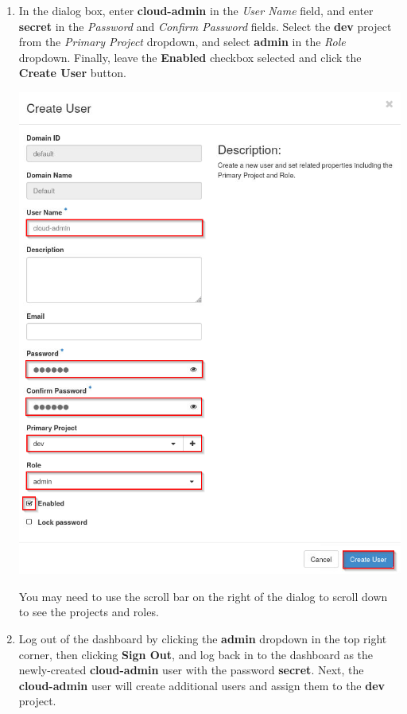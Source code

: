 \documentclass[letterpaper, 12pt]{article}
\begin{document}
\begin{enumerate}
    \item In the dialog box, enter \textbf{cloud-admin} in the \textit{User Name} field, and enter \textbf{secret} in the \textit{Password} and \textit{Confirm Password} fields.
    Select the \textbf{dev} project from the \textit{Primary Project} dropdown, and select \textbf{admin} in the \textit{Role} dropdown.
    Finally, leave the \textbf{Enabled} checkbox selected and click the \textbf{Create User} button.

    \begin{center}
        \includegraphics[width=\linewidth]{images/part3/step3.png}
    \end{center}

    \begin{tipbox}
        You may need to use the scroll bar on the right of the dialog to scroll down to see the projects and roles.
    \end{tipbox}

    \item Log out of the dashboard by clicking the \textbf{admin} dropdown in the top right corner, then clicking \textbf{Sign Out}, and log back in to the dashboard as the newly-created \textbf{cloud-admin} user with the password \textbf{secret}.
    Next, the \textbf{cloud-admin} user will create additional users and assign them to the \textbf{dev} project.


\end{enumerate}
\end{document}
